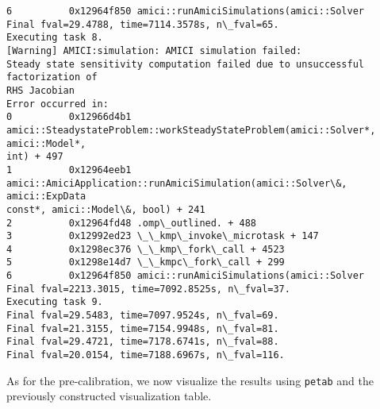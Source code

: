 \documentclass[11pt]{article}
\begin{document}
\begin{Verbatim}[commandchars=\\\{\}]
6          0x12964f850 amici::runAmiciSimulations(amici::Solver
Final fval=29.4788, time=7114.3578s, n\_fval=65.
Executing task 8.
[Warning] AMICI:simulation: AMICI simulation failed:
Steady state sensitivity computation failed due to unsuccessful factorization of
RHS Jacobian
Error occurred in:
0          0x12966d4b1
amici::SteadystateProblem::workSteadyStateProblem(amici::Solver*, amici::Model*,
int) + 497
1          0x12964eeb1
amici::AmiciApplication::runAmiciSimulation(amici::Solver\&, amici::ExpData
const*, amici::Model\&, bool) + 241
2          0x12964fd48 .omp\_outlined. + 488
3          0x12992ed23 \_\_kmp\_invoke\_microtask + 147
4          0x1298ec376 \_\_kmp\_fork\_call + 4523
5          0x1298e14d7 \_\_kmpc\_fork\_call + 299
6          0x12964f850 amici::runAmiciSimulations(amici::Solver
Final fval=2213.3015, time=7092.8525s, n\_fval=37.
Executing task 9.
Final fval=29.5483, time=7097.9524s, n\_fval=69.
Final fval=21.3155, time=7154.9948s, n\_fval=81.
Final fval=29.4721, time=7178.6741s, n\_fval=88.
Final fval=20.0154, time=7188.6967s, n\_fval=116.
    \end{Verbatim}

    As for the pre-calibration, we now visualize the results using
\texttt{petab} and the previously constructed visualization table.
\end{document}
